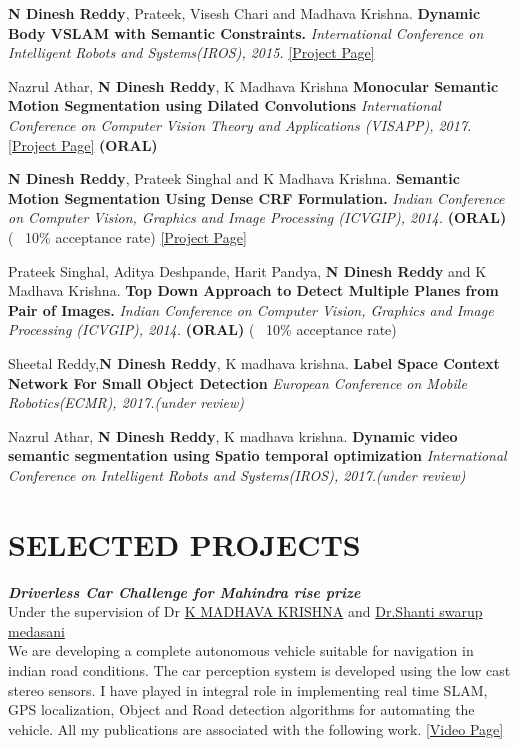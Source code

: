\documentclass[a4paper,10pt]{article}
\begin{document}
\textbf{N Dinesh Reddy}, Prateek, Visesh Chari and Madhava Krishna. \textbf{Dynamic Body VSLAM with Semantic Constraints.} {\sl International Conference on Intelligent Robots and Systems(IROS), 2015.} \href{https://researchweb.iiit.ac.in/~dineshreddy.n/zerotype/projects/DB-VSLAM/}{[Project Page]}

Nazrul Athar, \textbf{N Dinesh Reddy}, K Madhava Krishna \textbf{Monocular Semantic Motion Segmentation using Dilated
Convolutions} {\sl International Conference on Computer Vision Theory and Applications (VISAPP), 2017.}\href{http://robotics.iiit.ac.in/people/nazrul.athar/SMS/} {[Project Page]} \textbf{(ORAL)} 

\textbf{N Dinesh Reddy}, Prateek Singhal and K Madhava Krishna. \textbf{Semantic Motion Segmentation Using Dense CRF Formulation.} {\sl Indian Conference on Computer Vision, Graphics and Image Processing (ICVGIP), 2014.} \textbf{(ORAL)} (~ 10\% acceptance rate) \href{https://researchweb.iiit.ac.in/~dineshreddy.n/zerotype/projects/SMS/} {[Project Page]}
 

 Prateek Singhal, Aditya Deshpande, Harit Pandya, \textbf{N Dinesh Reddy} and K Madhava Krishna. \textbf{Top Down Approach to Detect Multiple Planes from Pair of Images.} {\sl Indian Conference on Computer Vision, Graphics and Image Processing (ICVGIP), 2014.} \textbf{(ORAL)}  (~ 10\% acceptance rate)
 
 Sheetal Reddy,\textbf{N Dinesh Reddy}, K madhava krishna. \textbf{Label Space Context Network For Small Object Detection} {\sl European Conference on Mobile Robotics(ECMR), 2017.(under review)}


Nazrul Athar, \textbf{N Dinesh Reddy}, K madhava krishna. \textbf{Dynamic video semantic segmentation using Spatio temporal
      optimization} {\sl International Conference on Intelligent Robots and Systems(IROS), 2017.(under review)}
 
 \section{SELECTED PROJECTS} 
 {\sl \textbf{Driverless Car Challenge for Mahindra rise prize}}\\
 Under the supervision of Dr \href{https://www.iiit.ac.in/people/faculty/mkrishna/} {K MADHAVA \textsc{KRISHNA}} and \href{https://www.linkedin.com/in/shanthi-swaroop-e-1b953527}{Dr.Shanti swarup medasani}  \\
 We are developing a complete autonomous vehicle suitable for navigation in indian road conditions. The car perception system is developed using the low cast stereo sensors. I have played in integral role in implementing real time SLAM, GPS localization, Object and Road detection algorithms for automating the vehicle. All my publications are associated with the following work. \href{https://www.youtube.com/playlist?list=PLemkgppNt5fqMpV24R32fbYjRsfz-Fjgm} {[Video Page]} 
 
\end{document}
